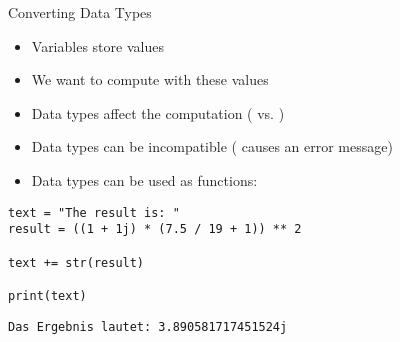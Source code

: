 
\begin{frame}[t,plain]
\titlepage
\end{frame}


\begin{frame}[fragile]{Converting Data Types}
%
\begin{itemize}
\item Variables store values
\item We want to compute with these values
\item Data types affect the computation ( vs. )
\item Data types can be incompatible ( causes an error message)
\item Data types can be used as functions:  \thus~ 
\end{itemize}
%
\begin{codebox}[Code: Data Type Conversion, width=.5\linewidth, nobeforeafter, equal height group = grpToString]
\begin{verbatim}
text = "The result is: "
result = ((1 + 1j) * (7.5 / 19 + 1)) ** 2

text += str(result)

print(text)
\end{verbatim}
\end{codebox}
%
\begin{cmdbox}[Output: Data Type Conversion, width=.49\linewidth, nobeforeafter, equal height group = grpToString]
\begin{verbatim}
Das Ergebnis lautet: 3.890581717451524j
\end{verbatim}
\end{cmdbox}
%
\end{frame}


